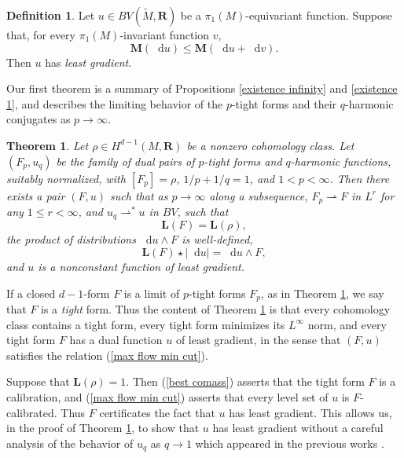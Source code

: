 \documentclass[reqno,11pt]{amsart}
\newcommand{\RR}{\mathbf{R}}
\newcommand*\dif{\mathop{}\!\mathrm{d}}
\newcommand{\weakto}{\rightharpoonup}
\newcommand{\Mass}{\mathbf M}
\newcommand{\Comass}{\mathbf L}
\newcommand{\dfn}[1]{\emph{#1}\index{#1}}
\newtheorem{mainthm}{Theorem}
\theoremstyle{definition}
\newtheorem{definition}[theorem]{Definition}
\numberwithin{equation}{section}
\begin{document}
\begin{definition}
Let $u \in BV(\tilde M, \RR)$ be a $\pi_1(M)$-equivariant function.
Suppose that, for every $\pi_1(M)$-invariant function $v$,
$$\Mass(\dif u) \leq \Mass(\dif u + \dif v).$$
Then $u$ has \dfn{least gradient}.
\end{definition}

Our first theorem is a summary of Propositions \ref{existence infinity} and \ref{existence 1}, and describes the limiting behavior of the $p$-tight forms and their $q$-harmonic conjugates as $p \to \infty$.

\begin{mainthm}\label{existence of infinity tight forms}
Let $\rho \in H^{d - 1}(M, \RR)$ be a nonzero cohomology class.
Let $(F_p, u_q)$ be the family of dual pairs of $p$-tight forms and $q$-harmonic functions, suitably normalized, with $[F_p] = \rho$, $1/p + 1/q = 1$, and $1 < p < \infty$.
Then there exists a pair $(F, u)$ such that as $p \to \infty$ along a subsequence, $F_p \weakto F$ in $L^r$ for any $1 \leq r < \infty$, and $u_q \weakto^* u$ in $BV$, such that
\begin{equation}\label{best comass}
\Comass(F) = \Comass(\rho),
\end{equation}
the product of distributions $\dif u \wedge F$ is well-defined,
\begin{equation}\label{max flow min cut}
\Comass(F) \star |\dif u| = \dif u \wedge F,
\end{equation}
and $u$ is a nonconstant function of least gradient.
\end{mainthm}

If a closed $d - 1$-form $F$ is a limit of $p$-tight forms $F_p$, as in Theorem \ref{existence of infinity tight forms}, we say that $F$ is a \dfn{tight} form.
Thus the content of Theorem \ref{existence of infinity tight forms} is that every cohomology class contains a tight form, every tight form minimizes its $L^\infty$ norm, and every tight form $F$ has a dual function $u$ of least gradient, in the sense that $(F, u)$ satisfies the relation (\ref{max flow min cut}).

Suppose that $\Comass(\rho) = 1$.
Then (\ref{best comass}) asserts that the tight form $F$ is a calibration, and (\ref{max flow min cut}) asserts that every level set of $u$ is $F$-calibrated.
Thus $F$ certificates the fact that $u$ has least gradient.
This allows us, in the proof of Theorem \ref{existence of infinity tight forms}, to show that $u$ has least gradient without a careful analysis of the behavior of $u_q$ as $q \to 1$ which appeared in the previous works \cite{daskalopoulos2020transverse,daskalopoulos2022}.
\end{document}
